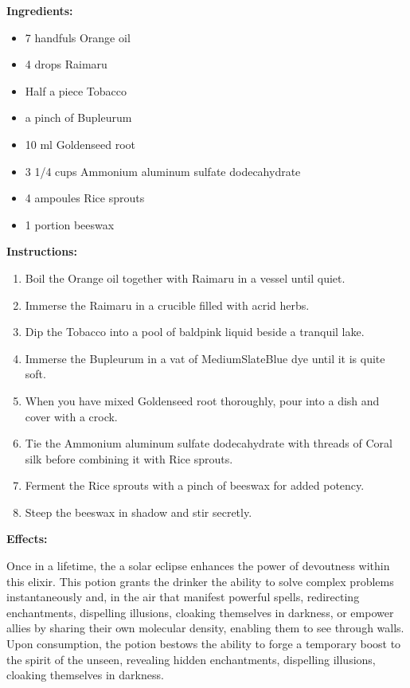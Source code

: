 \documentclass{article}
\begin{document}
\textbf{Ingredients:}

\begin{itemize}
  \item 7 handfuls Orange oil
  \item 4 drops Raimaru
  \item Half a piece Tobacco
  \item a pinch of Bupleurum
  \item 10 ml Goldenseed root
  \item 3 1/4 cups Ammonium aluminum sulfate dodecahydrate
  \item 4 ampoules Rice sprouts
  \item 1 portion beeswax
\end{itemize}

\textbf{Instructions:}

\begin{enumerate}
  \item Boil the Orange oil together with Raimaru in a vessel until quiet.
  \item Immerse the Raimaru in a crucible filled with acrid herbs.
  \item Dip the Tobacco into a pool of baldpink liquid beside a tranquil lake.
  \item Immerse the Bupleurum in a vat of MediumSlateBlue dye until it is quite soft.
  \item When you have mixed Goldenseed root thoroughly, pour into a dish and cover with a crock.
  \item Tie the Ammonium aluminum sulfate dodecahydrate with threads of Coral silk before combining it with Rice sprouts.
  \item Ferment the Rice sprouts with a pinch of beeswax for added potency.
  \item Steep the beeswax in shadow and stir secretly.
\end{enumerate}

\textbf{Effects:}

Once in a lifetime, the a solar eclipse enhances the power of devoutness within this elixir. This potion grants the drinker the ability to solve complex problems instantaneously and, in the air that manifest powerful spells, redirecting enchantments, dispelling illusions, cloaking themselves in darkness, or empower allies by sharing their own molecular density, enabling them to see through walls. Upon consumption, the potion bestows the ability to forge a temporary boost to the spirit of the unseen, revealing hidden enchantments, dispelling illusions, cloaking themselves in darkness.
\end{document}
